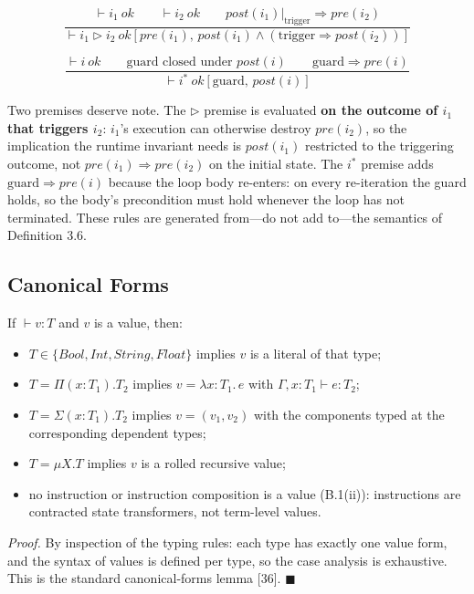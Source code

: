 \documentclass[
  11pt,
]{article}
\providecommand{\tightlist}{%
  \setlength{\itemsep}{0pt}\setlength{\parskip}{0pt}}
\begin{document}
\[\frac{\vdash i_1\ \mathit{ok} \qquad \vdash i_2\ \mathit{ok} \qquad post(i_1)\big|_{\text{trigger}} \Rightarrow pre(i_2)}{\vdash i_1 \triangleright i_2\ \mathit{ok}[pre(i_1),\, post(i_1) \wedge (\text{trigger} \Rightarrow post(i_2))]}\]

\[\frac{\vdash i\ \mathit{ok} \qquad \text{guard closed under } post(i) \qquad \text{guard} \Rightarrow pre(i)}{\vdash i^*\ \mathit{ok}[\text{guard},\, post(i)]}\]

Two premises deserve note. The \(\triangleright\) premise is evaluated
\textbf{on the outcome of \(i_1\) that triggers \(i_2\)}: \(i_1\)'s
execution can otherwise destroy \(pre(i_2)\), so the implication the
runtime invariant needs is \(post(i_1)\) restricted to the triggering
outcome, not \(pre(i_1) \Rightarrow pre(i_2)\) on the initial state. The
\(i^*\) premise adds \(\text{guard} \Rightarrow pre(i)\) because the
loop body re-enters: on every re-iteration the guard holds, so the
body's precondition must hold whenever the loop has not terminated.
These rules are generated from---do not add to---the semantics of
Definition 3.6.

\subsection{Canonical Forms}\label{canonical-forms}

If \(\vdash v : T\) and \(v\) is a value, then:

\begin{itemize}
\tightlist
\item
  \(T \in \{Bool, Int, String, Float\}\) implies \(v\) is a literal of
  that type;
\item
  \(T = \Pi(x:T_1).T_2\) implies \(v = \lambda x{:}T_1.\,e\) with
  \(\Gamma, x{:}T_1 \vdash e : T_2\);
\item
  \(T = \Sigma(x:T_1).T_2\) implies \(v = (v_1, v_2)\) with the
  components typed at the corresponding dependent types;
\item
  \(T = \mu X.T\) implies \(v\) is a rolled recursive value;
\item
  no instruction or instruction composition is a value (B.1(ii)):
  instructions are contracted state transformers, not term-level values.
\end{itemize}

\emph{Proof.} By inspection of the typing rules: each type has exactly
one value form, and the syntax of values is defined per type, so the
case analysis is exhaustive. This is the standard canonical-forms lemma
{[}36{]}. \(\blacksquare\)
\end{document}
